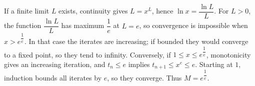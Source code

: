 If a finite limit $L$ exists, continuity gives $L=x^L$, hence $\ln x=\dfrac{\ln L}{L}$. For $L>0$, the function $\dfrac{\ln L}{L}$ has maximum $\dfrac{1}{e}$ at $L=e$, so convergence is impossible when $x>e^{\dfrac{1}{e}}$. In that case the iterates are increasing; if bounded they would converge to a fixed point, so they tend to infinity. Conversely, if $1\le x\le e^{\dfrac{1}{e}}$, monotonicity gives an increasing iteration, and $t_n\le e$ implies $t_{n+1}\le x^e\le e$. Starting at $1$, induction bounds all iterates by $e$, so they converge. Thus $\boxed{M=e^{\dfrac{1}{e}}}$.
